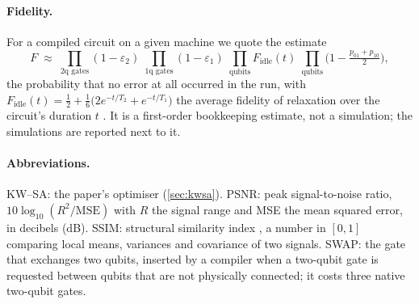 \paragraph{Fidelity.}
For a compiled circuit on a given machine we quote the estimate
\begin{equation}
F \;\approx\; \prod_{\text{2q gates}}(1-\varepsilon_{2})\;\prod_{\text{1q gates}}(1-\varepsilon_{1})\;
\prod_{\text{qubits}} F_{\mathrm{idle}}(t)\;\prod_{\text{qubits}}\bigl(1-\tfrac{p_{01}+p_{10}}{2}\bigr),
\label{eq:fidelity}
\end{equation}
the probability that no error at all occurred in the run, with
$F_{\mathrm{idle}}(t) = \tfrac12 + \tfrac16\bigl(2e^{-t/T_2}+e^{-t/T_1}\bigr)$ the average
fidelity of relaxation over the circuit's duration $t$ \cite{nielsen}.  It is a first-order
bookkeeping estimate, not a simulation; the simulations are reported next to it.

\paragraph{Abbreviations.}
KW--SA: the paper's optimiser (\cref{sec:kwsa}).  PSNR: peak signal-to-noise ratio,
$10\log_{10}(R^2/\mathrm{MSE})$ with $R$ the signal range and MSE the mean squared error, in
decibels (dB).  SSIM: structural similarity index \cite{wang}, a number in $[0,1]$ comparing
local means, variances and covariance of two signals.  SWAP: the gate that exchanges two qubits,
inserted by a compiler when a two-qubit gate is requested between qubits that are not physically
connected; it costs three native two-qubit gates.
